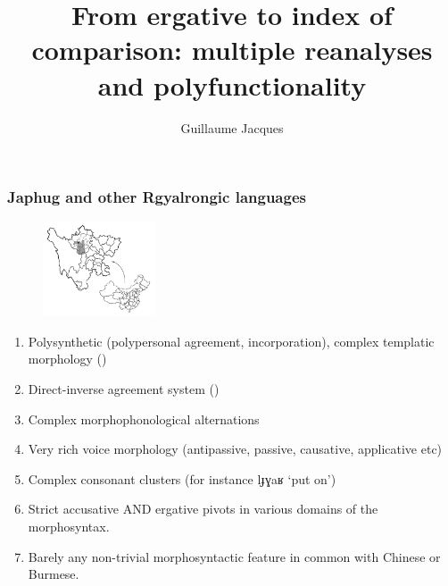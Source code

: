 \documentclass[xcolor=table]{beamer}
\newcommand{\ipa}[1]{{\phon \mbox{#1}}} %
\begin{document}
 \title{From ergative to index of comparison: multiple reanalyses and polyfunctionality}
 \author{Guillaume Jacques}
 \maketitle
 
  \begin{frame} 
 \frametitle{Japhug and other Rgyalrongic languages} 
 \begin{figure}[H]
\centering
\includegraphics[height=28mm]{carte.JPG}
\end{figure}
 
 
 \begin{enumerate}[<+->]
 \item Polysynthetic (polypersonal agreement, incorporation), complex templatic morphology (\citealt{jacques13harmonization})
  \item Direct-inverse agreement system (\citealt{jacques10inverse})
 \item Complex morphophonological alternations
 \item Very rich voice morphology (antipassive, passive, causative, applicative etc)
 \item Complex consonant clusters (for instance \ipa{lɟɣaʁ} `put on')
 \item Strict accusative AND ergative pivots in various domains of the morphosyntax.
 \item Barely any non-trivial morphosyntactic feature in common with Chinese or Burmese.
 \end{enumerate}
  
  \end{frame}   
\end{document}
